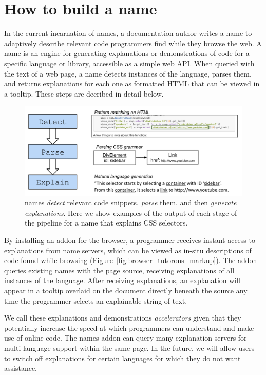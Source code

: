 \section{How to build a \gls{name}}

In the current incarnation of \glspl{name}, a documentation author writes a \gls{name} to adaptively describe relevant code programmers find while they browse the web.
A \gls{name} is an engine for generating explanations or demonstrations of code for a specific language or library, accessible as a simple web API.
When queried with the text of a web page, a \gls{name} detects instances of the language, parses them, and returns explanations for each one as formatted HTML that can be viewed in a tooltip.
These steps are decribed in detail below.

\begin{figure}
\centering
    \includegraphics[width=.4\textwidth]{figures/explanation_pipeline}
    \caption{\Glspl{name} \emph{detect} relevant code snippets, \emph{parse} them, and then \emph{generate explanations}.  Here we show examples of the output of each stage of the pipeline for a \gls{name} that explains CSS selectors.}
    \label{fig:explanation_pipeline}
\end{figure}

By installing an addon for the browser, a programmer receives instant access to explanations from \gls{name} servers, which can be viewed as in-situ descriptions of code found while browsing (Figure~\ref{fig:browser_tutorons_markup}).
The addon queries existing \glspl{name} with the page source, receiving explanations of all instances of the language.
After receiving explanations, an explanation will appear in a tooltip overlaid on the document directly beneath the source any time the programmer selects an explainable string of text.

We call these explanations and demonstrations \emph{accelerators} given that they potentially increase the speed at which programmers can understand and make use of online code.
The \Glspl{name} addon can query many explanation servers for multi-language support within the same page.
In the future, we will allow users to switch off explanations for certain languages for which they do not want assistance.

